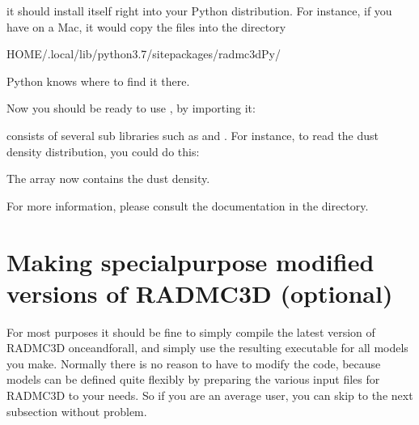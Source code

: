 \documentclass[letterpaper,10pt,english]{sphinxmanual}
\begin{document}
\begin{sphinxVerbatim}[commandchars=\\\{\}]
   
\end{sphinxVerbatim}

it should install itself right into your Python distribution. For instance,
if you have  on a Mac, it would copy the files into the
directory

\begin{sphinxVerbatim}[commandchars=\\\{\}]
\PYGZdl{}HOME/.local/lib/python3.7/site\PYGZhy{}packages/radmc3dPy/
\end{sphinxVerbatim}

Python knows where to find it there.

Now you should be ready to use , by importing it:

\begin{sphinxVerbatim}[commandchars=\\\{\}]
 
\end{sphinxVerbatim}

 consists of
several sub libraries such as  and
. For instance, to read the dust density
distribution, you could do this:

\begin{sphinxVerbatim}[commandchars=\\\{\}]
   
  
\end{sphinxVerbatim}

The  array now contains the dust density.

For more information, please consult the  documentation
in the  directory.


\section{Making special\sphinxhyphen{}purpose modified versions of RADMC\sphinxhyphen{}3D (optional)}
\label{\detokenize{installation:making-special-purpose-modified-versions-of-radmc-3d-optional}}\label{\detokenize{installation:sec-special-purpose-compile}}
For most purposes it should be fine to simply compile the latest version of
RADMC\sphinxhyphen{}3D once\sphinxhyphen{}and\sphinxhyphen{}for\sphinxhyphen{}all, and simply use the resulting 
executable for all models you make. Normally there is no reason to have to
modify the code, because models can be defined quite flexibly by preparing
the various input files for RADMC\sphinxhyphen{}3D to your needs. So if you are an
average user, you can skip to the next subsection without problem.
\end{document}

